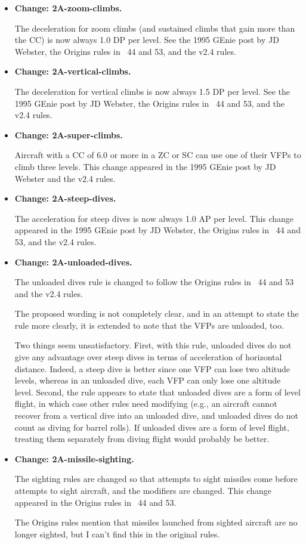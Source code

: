 \documentclass[10pt]{report}
\newcommand{\itemtag}[1]{\item \textbf{Change: #1.}\par}
\begin{document}
\begin{itemize}
    \itemtag{2A-zoom-climbs} The deceleration for zoom climbs (and sustained climbs that gain more than the CC) is now always 1.0 DP per level. See the 1995 GEnie post by JD Webster, the Origins rules {in \APJ}~44 and 53, and the v2.4 rules.

    \itemtag{2A-vertical-climbs} The deceleration for vertical climbs is now always 1.5 DP per level. See the 1995 GEnie post by JD Webster, the Origins rules {in \APJ}~44 and 53, and the v2.4 rules.

    \itemtag{2A-super-climbs} Aircraft with a CC of 6.0 or more in a ZC or SC can use one of their VFPs to climb three levels. This change appeared in the 1995 GEnie post by JD Webster and the v2.4 rules.

    \itemtag{2A-steep-dives} The acceleration for steep dives is now always 1.0 AP per level. This change appeared in the 1995 GEnie post by JD Webster, the Origins rules in {\APJ}~44 and 53, and the v2.4 rules.

    \itemtag{2A-unloaded-dives} The unloaded dives rule is changed to follow the Origins rules in {\APJ}~44 and 53 and the v2.4 rules.
    
    The proposed wording is not completely clear, and in an attempt to state the rule more clearly, it is extended to note that the VFPs are unloaded, too. 
    
    Two things seem unsatisfactory. First, with this rule, unloaded dives do not give any advantage over steep dives in terms of acceleration of horizontal distance. Indeed, a steep dive is better since one VFP can lose two altitude levels, whereas in an unloaded dive, each VFP can only lose one altitude level. Second, the rule appears to state that unloaded dives are a form of level flight, in which case other rules need modifying (e.g., an aircraft cannot recover from a vertical dive into an unloaded dive, and unloaded dives do not count as diving for barrel rolls). If unloaded dives are a form of level flight, treating them separately from diving flight would probably be better.

    \itemtag{2A-missile-sighting} The sighting rules are changed so that attempts to sight missiles come before attempts to sight aircraft, and the modifiers are changed. This change appeared in the Origins rules in {\APJ}~44 and 53.
    
    The Origins rules mention that missiles launched from sighted aircraft are no longer sighted, but I can’t find this in the original rules.
    

\end{itemize}
\end{document}
